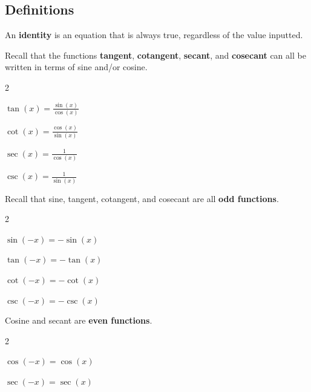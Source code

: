 \subsection*{Definitions} \label{definitions-supplement-section-trig-identities}

\begin{myDefinition}[{Identity}]
	
	An \textbf{identity} is an equation that is always true, regardless of the value inputted.
\end{myDefinition}

\begin{myDefinition}
	
	Recall that the functions \textbf{tangent}, \textbf{cotangent}, \textbf{secant}, and \textbf{cosecant} can all be written in terms of sine and/or cosine.
	\begin{itemize}
	\end{itemize}
\end{myDefinition}

\begin{myDefinition}
	
	Recall that sine, tangent, cotangent, and cosecant are all \textbf{odd functions}. 
	\begin{itemize}
		\begin{multicols}{2}
			\item $\sin(-x)=-\sin(x)$
			\item $\tan(-x)=-\tan(x)$
			\item $\cot(-x)=-\cot(x)$
			\item $\csc(-x)=-\csc(x)$
		\end{multicols}
	\end{itemize}
	Cosine and secant are \textbf{even functions}.
	\begin{itemize}
		\begin{multicols}{2}
			\item $\cos(-x)=\cos(x)$
			\item $\sec(-x)=\sec(x)$
		\end{multicols}
	\end{itemize}
\end{myDefinition}

